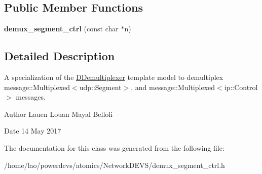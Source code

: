 \subsection*{Public Member Functions}
\begin{DoxyCompactItemize}
\item 
{\bfseries demux\+\_\+segment\+\_\+ctrl} (const char $\ast$n)\hypertarget{classdemux__segment__ctrl_afcff5240429671a63776c2f2c136d243}{}\label{classdemux__segment__ctrl_afcff5240429671a63776c2f2c136d243}

\end{DoxyCompactItemize}


\subsection{Detailed Description}
A specialization of the \hyperlink{classDDemultiplexer}{D\+Demultiplexer} template model to demultiplex message\+::\+Multiplexed$<$udp\+::\+Segment$>$, and message\+::\+Multiplexed$<$ip\+::\+Control$>$ messages. 

\begin{DoxyAuthor}{Author}
Lauen Louan Mayal Belloli 
\end{DoxyAuthor}
\begin{DoxyDate}{Date}
14 May 2017 
\end{DoxyDate}


The documentation for this class was generated from the following file\+:\begin{DoxyCompactItemize}
\item 
/home/lao/powerdevs/atomics/\+Network\+D\+E\+V\+S/demux\+\_\+segment\+\_\+ctrl.\+h\end{DoxyCompactItemize}
